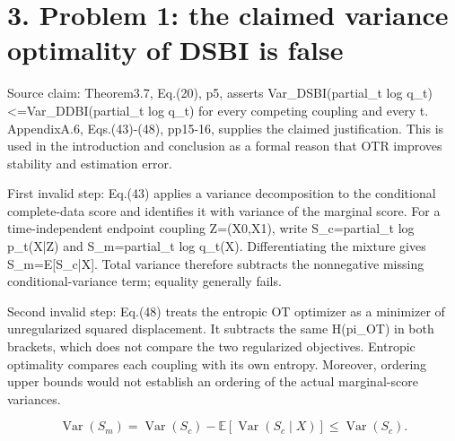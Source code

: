 \documentclass[10pt]{article}
\begin{document}
\section*{3. Problem 1: the claimed variance optimality of DSBI is false}
Source claim: Theorem3.7, Eq.(20), p5, asserts Var\_DSBI(partial\_t log q\_t)<=Var\_DDBI(partial\_t log q\_t) for every competing coupling and every t. AppendixA.6, Eqs.(43)-(48), pp15-16, supplies the claimed justification. This is used in the introduction and conclusion as a formal reason that OTR improves stability and estimation error.\par
First invalid step: Eq.(43) applies a variance decomposition to the conditional complete-data score and identifies it with variance of the marginal score. For a time-independent endpoint coupling Z=(X0,X1), write S\_c=partial\_t log p\_t(X|Z) and S\_m=partial\_t log q\_t(X). Differentiating the mixture gives S\_m=E[S\_c|X]. Total variance therefore subtracts the nonnegative missing conditional-variance term; equality generally fails.\par
Second invalid step: Eq.(48) treats the entropic OT optimizer as a minimizer of unregularized squared displacement. It subtracts the same H(pi\_OT) in both brackets, which does not compare the two regularized objectives. Entropic optimality compares each coupling with its own entropy. Moreover, ordering upper bounds would not establish an ordering of the actual marginal-score variances.\par
\[\operatorname{Var}(S_m)=\operatorname{Var}(S_c)-\mathbb E[\operatorname{Var}(S_c\mid X)]\leq\operatorname{Var}(S_c).\]\par
\end{document}
